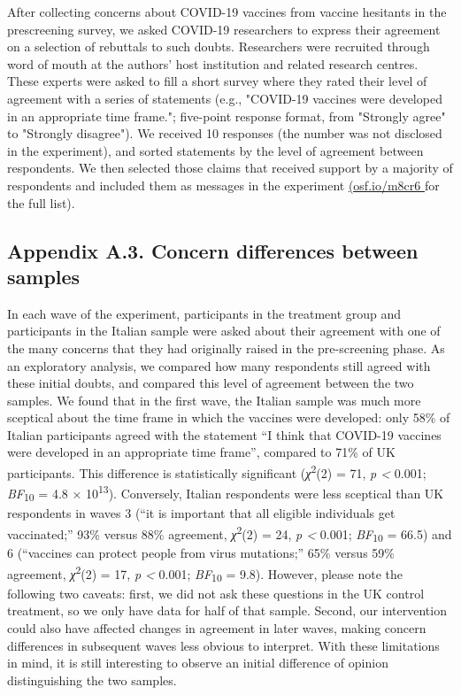 \documentclass[authordate, empirical]{jote-new-article}
\begin{document}
After collecting concerns about COVID-19 vaccines from vaccine hesitants in the prescreening survey, we asked COVID-19 researchers to express their agreement on a selection of rebuttals to such doubts. Researchers were recruited through word of mouth at the authors' host institution and related research centres. These experts were asked to fill a short survey where they rated their level of agreement with a series of statements (e.g., "COVID-19 vaccines were developed in an appropriate time frame."; five-point response format, from "Strongly agree" to "Strongly disagree"). We received 10 responses (the number was not disclosed in the experiment), and sorted statements by the level of agreement between respondents. We then selected those claims that received support by a majority of respondents and included them as messages in the experiment \href{https://osf.io/m8cr6/}{(osf.io/m8cr6 }for the full list).



\subsection{Appendix A.3. Concern differences between samples}



In each wave of the experiment, participants in the treatment group and participants in the Italian sample were asked about their agreement with one of the many concerns that they had originally raised in the pre-screening phase. As an exploratory analysis, we compared how many respondents still agreed with these initial doubts, and compared this level of agreement between the two samples. We found that in the first wave, the Italian sample was much more sceptical about the time frame in which the vaccines were developed: only 58\% of Italian participants agreed with the statement “I think that COVID-19 vaccines were developed in an appropriate time frame”, compared to 71\% of UK participants. This difference is statistically significant (\emph{χ}\textsuperscript{2}(2) = 71, \emph{p < }0.001; \emph{BF}\textsubscript{10 }= 4.8 × 10\textsuperscript{13}). Conversely, Italian respondents were less sceptical than UK respondents in waves 3 (“it is important that all eligible individuals get vaccinated;” 93\% versus 88\% agreement, \emph{χ}\textsuperscript{2}(2) = 24, \emph{p < }0.001; \emph{BF}\textsubscript{10 }= 66.5) and 6 (“vaccines can protect people from virus mutations;” 65\% versus 59\% agreement, \emph{χ}\textsuperscript{2}(2) = 17, \emph{p < }0.001; \emph{BF}\textsubscript{10 }= 9.8). However, please note the following two caveats: first, we did not ask these questions in the UK control treatment, so we only have data for half of that sample. Second, our intervention could also have affected changes in agreement in later waves, making concern differences in subsequent waves less obvious to interpret. With these limitations in mind, it is still interesting to observe an initial difference of opinion distinguishing the two samples.
\end{document}
